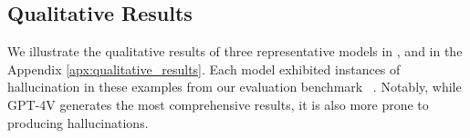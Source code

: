 \subsection{Qualitative Results}
\label{subsec:qualitative}
\vspace{-1mm}

We illustrate the qualitative results of three representative models in ,  and  in the Appendix \ref{apx:qualitative_results}. Each model exhibited instances of hallucination in these examples from our evaluation benchmark \data~. Notably, while GPT-4V generates the most comprehensive results, it is also more prone to producing hallucinations. 